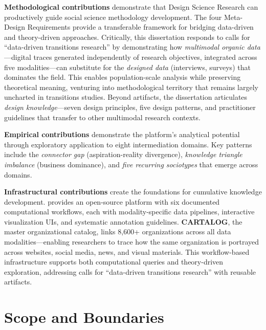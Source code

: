 \documentclass[../main.tex]{subfiles}
\begin{document}
\textbf{Methodological contributions} demonstrate that Design Science Research can productively guide social science methodology development. The four Meta-Design Requirements provide a transferable framework for bridging data-driven and theory-driven approaches. Critically, this dissertation responds to calls for ``data-driven transitions research'' by demonstrating how \emph{multimodal organic data}---digital traces generated independently of research objectives, integrated across five modalities---can substitute for the \emph{designed data} (interviews, surveys) that dominates the field. This enables population-scale analysis while preserving theoretical meaning, venturing into methodological territory that remains largely uncharted in transitions studies. Beyond artifacts, the dissertation articulates \emph{design knowledge}---seven design principles, five design patterns, and practitioner guidelines that transfer to other multimodal research contexts.

\textbf{Empirical contributions} demonstrate the platform's analytical potential through exploratory application to eight intermediation domains. Key patterns include the \emph{connector gap} (aspiration-reality divergence), \emph{knowledge triangle imbalance} (business dominance), and \emph{five recurring sociotypes} that emerge across domains.

\textbf{Infrastructural contributions} create the foundations for cumulative knowledge development. \RoleBox{} provides an open-source platform with six documented computational workflows, each with modality-specific data pipelines, interactive visualization UIs, and systematic annotation guidelines. \textbf{CARTALOG}, the master organizational catalog, links 8,600+ organizations across all data modalities---enabling researchers to trace how the same organization is portrayed across websites, social media, news, and visual materials. This workflow-based infrastructure supports both computational queries and theory-driven exploration, addressing calls for ``data-driven transitions research'' with reusable artifacts.


\section{Scope and Boundaries}
\label{sec:intro:scope}
\end{document}
